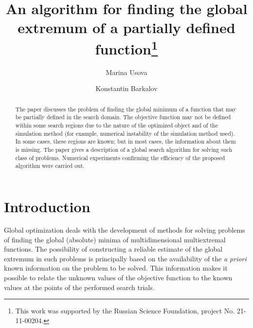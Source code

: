 \documentclass[runningheads]{llncs}
\begin{document}
%
\title{An algorithm for finding the global extremum 
of a partially defined function\thanks{This work was supported by the Russian Science Foundation, project No. 21-11-00204.}}
%
%
\author{Marina Usova \and
Konstantin Barkalov}
%
%
%
\maketitle              %
%
\begin{abstract}
The paper discusses the problem of finding the global minimum of a function that may be partially defined in the search domain. The objective function may not be defined within some search regions due to the nature of the optimized object and of the simulation method (for example, numerical instability of the simulation method used). In some cases, these regions are known; but in most cases, the information about them is missing. The paper gives a description of a global search algorithm for solving such class of problems. Numerical experiments confirming the efficiency of the proposed algorithm were carried out.

\end{abstract}
%
%
%
\section{Introduction}
Global optimization deals with the development of methods for solving problems of finding the global (absolute) minima of multidimensional multiextremal functions. The possibility of constructing a reliable estimate of the global extremum in such problems is principally based on the availability of the \textit{a priori} known information on the problem to be solved. This information makes it possible to relate the unknown values of the objective function to the known values at the points of the performed search trials.
\end{document}
